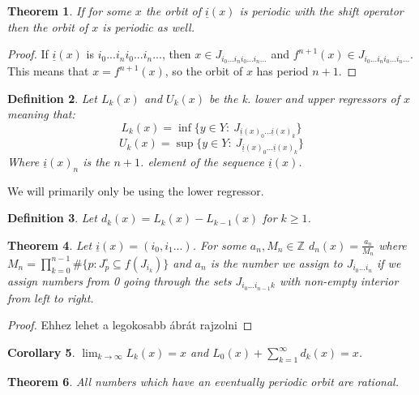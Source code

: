 \documentclass{article}
\newtheorem{theorem}{Theorem}[section]
\newtheorem{cor}[theorem]{Corollary}
\newtheorem{defin}[theorem]{Definition}
\begin{document}
\begin{theorem}
If for some $x$ the orbit of $\underline{i}(x)$ is periodic with the shift operator then the orbit of $x$ is periodic as well.
\end{theorem}

\begin{proof}
If $\underline{i}(x)$ is $i_0...i_ni_0...i_n...$, then $x \in J_{i_0...i_ni_0...i_n...}$ and $f^{n+1}(x) \in J_{i_0...i_ni_0...i_n...}$. This means that $x = f^{n+1}(x)$, so the orbit of $x$ has period $n+1$.
\end{proof}

\begin{defin}
Let $L_k(x)$ and $U_k(x)$ be the k. lower and upper regressors of $x$ meaning that: \[
L_k(x) = \inf\{y\in Y:\: J_{\underline{i}(x)_0...\underline{i}(x)_k}\}
\]
\[
U_k(x) = \sup\{y\in Y:\: J_{\underline{i}(x)_0...\underline{i}(x)_k}\}
\]
Where $\underline{i}(x)_n$ is the $n+1$. element of the sequence $\underline{i}(x)$.
\end{defin}

We will primarily only be using the lower regressor.

\begin{defin}
Let $d_k(x) = L_k(x) - L_{k-1}(x)$ for $k\geq1$.
\end{defin}

\begin{theorem}
Let $\underline{i}(x) = (i_0,i_1...)$. For some $a_n, M_n \in \mathbb{Z}$ $d_n(x) = \frac{a_n}{M_n}$ where $M_n = \prod_{k=0}^{n-1} \#\{p: J_p^\circ \subseteq f(J_{i_k})\} $ and $a_n$ is the number we assign to $J_{i_0...i_n}$ if we assign numbers from 0 going through the sets $J_{i_0...i_{n-1}k}$ with non-empty interior from left to right.
\end{theorem}

\begin{proof}
Ehhez lehet a legokosabb ábrát rajzolni
\end{proof}

\begin{cor}
$\lim_{k\rightarrow \infty} L_k(x) = x$ and $L_0(x) + \sum_{k=1}^\infty d_k(x) = x$.
\end{cor}

\begin{theorem}
All numbers which have an eventually periodic orbit are rational.
\end{theorem}
\end{document}
